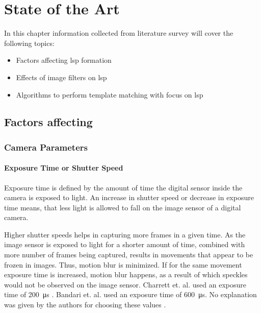 \chapter{State of the Art}\label{Chap:Sota}
In this chapter information collected from literature survey will cover the following topics:

\begin{itemize}
    \item Factors affecting \gls{lsp} formation
    \item Effects of image filters on \gls{lsp}
    \item Algorithms to perform template matching with focus on \gls{lsp}
\end{itemize}

\section{Factors affecting }

\subsection{Camera Parameters}

    \subsubsection*{Exposure Time or Shutter Speed}\label{Subsubsection:Exposure_Time}
    Exposure time is defined by the amount of time the digital sensor inside the camera is exposed to light. An increase in shutter speed or decrease in exposure time means, that less light is allowed to fall on the image sensor of a digital camera.

    \vspace{5mm}
    \noindent Higher shutter speeds helps in capturing more frames in a given time. As the image sensor is exposed to light for a shorter amount of time, combined with more number of frames being captured, results in movements that appear to be frozen in images. Thus, motion blur is minimized. If for the same movement exposure time is increased, motion blur happens, as a result of which speckles would not be observed on the image sensor. Charrett et. al.  used an exposure time of \SI{200}{\micro\second} \cite{charrett_2018}. Bandari et. al. used an exposure time of \SI{600}{\micro\second}. No explanation was given by the authors for choosing these values \cite{bandari}.

    \vspace{5mm}

